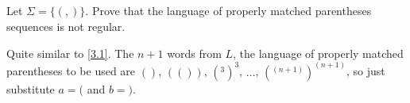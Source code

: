 \subsection{}


Let $\Sigma = \{(,)\}$. Prove that the language of properly matched parentheses sequences is not regular.


Quite similar to \ref{3.1}. The $n+1$ words from $L$, the language of properly matched parentheses to be used are $()$, $(())$, $(^3)^3$, $\dots$, $(^{(n+1)})^{(n+1)}$, so just substitute $a = ($ and $b = )$.